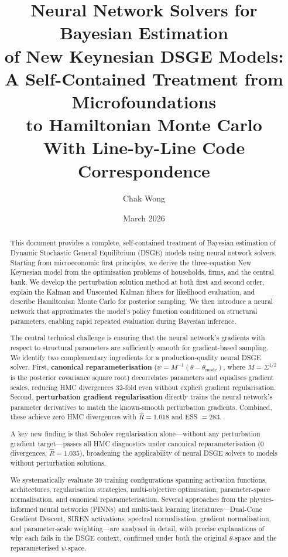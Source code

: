 \documentclass[11pt,a4paper]{article}
\title{Neural Network Solvers for Bayesian Estimation\\
	of New Keynesian DSGE Models:\\[6pt]
	\large A Self-Contained Treatment from Microfoundations\\
	to Hamiltonian Monte Carlo\\[6pt]
	\normalsize With Line-by-Line Code Correspondence}
\author{Chak Wong}
\date{March 2026}
\theoremstyle{definition}
\begin{document}
	\maketitle
	
	\begin{abstract}
		This document provides a complete, self-contained treatment of Bayesian estimation of Dynamic Stochastic General Equilibrium (DSGE) models using neural network solvers.
		Starting from microeconomic first principles, we derive the three-equation New Keynesian model from the optimisation problems of households, firms, and the central bank.
		We develop the perturbation solution method at both first and second order, explain the Kalman and Unscented Kalman filters for likelihood evaluation, and describe Hamiltonian Monte Carlo for posterior sampling.
		We then introduce a neural network that approximates the model's policy function conditioned on structural parameters, enabling rapid repeated evaluation during Bayesian inference.
		
		The central technical challenge is ensuring that the neural network's gradients with respect to structural parameters are sufficiently smooth for gradient-based sampling.
		We identify two complementary ingredients for a production-quality neural DSGE solver.
		First, \textbf{canonical reparameterisation} ($\psi = M^{-1}(\theta - \theta_{\mathrm{mode}})$, where $M = \Sigma^{1/2}$ is the posterior covariance square root) decorrelates parameters and equalises gradient scales, reducing HMC divergences 32-fold even without explicit gradient regularisation.
		Second, \textbf{perturbation gradient regularisation} directly trains the neural network's parameter derivatives to match the known-smooth perturbation gradients.
		Combined, these achieve zero HMC divergences with $\hat{R} = 1.018$ and ESS $= 283$.
		
		A key new finding is that Sobolev regularisation alone---without any perturbation gradient target---passes all HMC diagnostics under canonical reparameterisation (0 divergences, $\hat{R} = 1.035$), broadening the applicability of neural DSGE solvers to models without perturbation solutions.
		
		We systematically evaluate 30 training configurations spanning activation functions, architectures, regularisation strategies, multi-objective optimisation, parameter-space normalisation, and canonical reparameterisation.
		Several approaches from the physics-informed neural networks (PINNs) and multi-task learning literatures---Dual-Cone Gradient Descent, SIREN activations, spectral normalisation, gradient normalisation, and parameter-scale weighting---are analysed in detail, with precise explanations of why each fails in the DSGE context, confirmed under both the original $\theta$-space and the reparameterised $\psi$-space.
		

\end{abstract}
\end{document}
